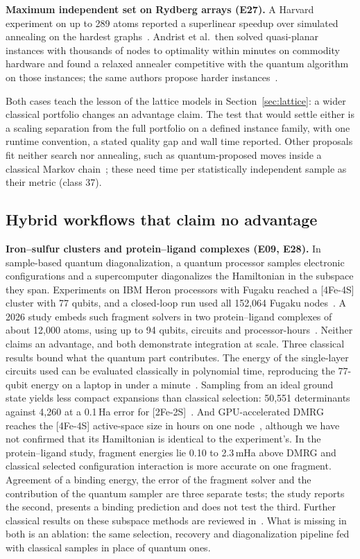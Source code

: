 \documentclass[10pt,a4paper]{article}
\begin{document}
\textbf{Maximum independent set on Rydberg arrays (E27).} A Harvard experiment on up to 289 atoms reported a superlinear speedup over simulated annealing on the hardest graphs~\cite{ebadi2022}. Andrist et al.\ then solved quasi-planar instances with thousands of nodes to optimality within minutes on commodity hardware and found a relaxed annealer competitive with the quantum algorithm on those instances; the same authors propose harder instances~\cite{andrist2023}.

Both cases teach the lesson of the lattice models in Section~\ref{sec:lattice}: a wider classical portfolio changes an advantage claim. The test that would settle either is a scaling separation from the full portfolio on a defined instance family, with one runtime convention, a stated quality gap and wall time reported. Other proposals fit neither search nor annealing, such as quantum-proposed moves inside a classical Markov chain~\cite{layden2023,orfi2024,marshall2026,hsieh2026}; these need time per statistically independent sample as their metric (class 37).

\subsection{Hybrid workflows that claim no advantage}
\textbf{Iron--sulfur clusters and protein--ligand complexes (E09, E28).} In sample-based quantum diagonalization, a quantum processor samples electronic configurations and a supercomputer diagonalizes the Hamiltonian in the subspace they span. Experiments on IBM Heron processors with Fugaku reached a [4Fe-4S] cluster with 77 qubits, and a closed-loop run used all 152{,}064 Fugaku nodes~\cite{shirakawa2025}. A 2026 study embeds such fragment solvers in two protein--ligand complexes of about 12{,}000 atoms, using up to 94 qubits, \merzCircuits{} circuits and \merzQpu{} processor-hours~\cite{merz2026}. Neither claims an advantage, and both demonstrate integration at scale. Three classical results bound what the quantum part contributes. The energy of the single-layer circuits used can be evaluated classically in polynomial time, reproducing the 77-qubit energy on a laptop in under a minute~\cite{belagali2026}. Sampling from an ideal ground state yields less compact expansions than classical selection: 50{,}551 determinants against 4{,}260 at a 0.1\,Ha error for [2Fe-2S]~\cite{reinholdt2025}. And GPU-accelerated DMRG reaches the [4Fe-4S] active-space size in \feDmrgH{} hours on one node~\cite{legeza2026}, although we have not confirmed that its Hamiltonian is identical to the experiment's. In the protein--ligand study, fragment energies lie 0.10 to 2.3\,mHa above DMRG and classical selected configuration interaction is more accurate on one fragment. Agreement of a binding energy, the error of the fragment solver and the contribution of the quantum sampler are three separate tests; the study reports the second, presents a binding prediction and does not test the third. Further classical results on these subspace methods are reviewed in~\cite{bonilla2026}. What is missing in both is an ablation: the same selection, recovery and diagonalization pipeline fed with classical samples in place of quantum ones.
\end{document}
